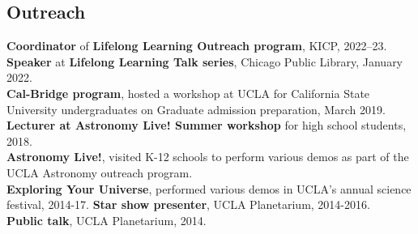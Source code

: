 \documentclass[margin, line]{res}
\begin{document}
\begin{resume}

%

%
%
%


\section{\sc Outreach}
{\bf Coordinator} of {\bf Lifelong Learning Outreach program}, KICP, 2022--23. \\
{\bf Speaker} at {\bf Lifelong Learning Talk series}, Chicago Public Library, January 2022. \\
{\bf Cal-Bridge program}, hosted a workshop at UCLA for California State University undergraduates on Graduate admission preparation, March 2019. \\
{\bf Lecturer at Astronomy Live! Summer workshop} for high school students, 2018. \\
{\bf Astronomy Live!}, visited K-12 schools to perform various demos as part of the UCLA Astronomy outreach program. \\
{\bf Exploring Your Universe}, performed various demos in UCLA's annual science festival, 2014-17.
{\bf Star show presenter}, UCLA Planetarium, 2014-2016. \\
{\bf Public talk}, UCLA Planetarium, 2014. \\



\end{resume}
\end{document}
